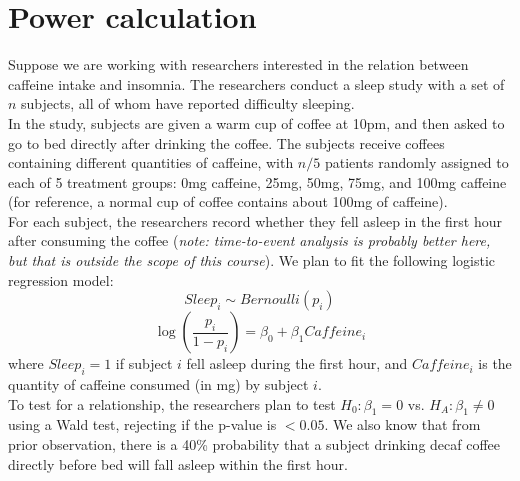\documentclass[11pt]{article}
\begin{document}
\section*{Power calculation}

Suppose we are working with researchers interested in the relation between caffeine intake and insomnia. The researchers conduct a sleep study with a set of $n$ subjects, all of whom have reported difficulty sleeping.\\

\noindent In the study, subjects are given a warm cup of coffee at 10pm, and then asked to go to bed directly after drinking the coffee. The subjects receive coffees containing different quantities of caffeine, with $n/5$ patients randomly assigned to each of 5 treatment groups: 0mg caffeine, 25mg, 50mg, 75mg, and 100mg caffeine (for reference, a normal cup of coffee contains about 100mg of caffeine).\\

\noindent For each subject, the researchers record whether they fell asleep in the first hour after consuming the coffee (\textit{note: time-to-event analysis is probably better here, but that is outside the scope of this course}). We plan to fit the following logistic regression model:
$$Sleep_i \sim Bernoulli(p_i)$$
$$\log \left( \frac{p_i}{1-p_i} \right) = \beta_0 + \beta_1 Caffeine_i$$
where $Sleep_i = 1$ if subject $i$ fell asleep during the first hour, and $Caffeine_i$ is the quantity of caffeine consumed (in mg) by subject $i$.\\

\noindent To test for a relationship, the researchers plan to test $H_0: \beta_1 = 0$ vs. $H_A: \beta_1 \neq 0$ using a Wald test, rejecting if the p-value is $< 0.05$. We also know that from prior observation, there is a 40\% probability that a subject drinking decaf coffee directly before bed will fall asleep within the first hour.
\end{document}
